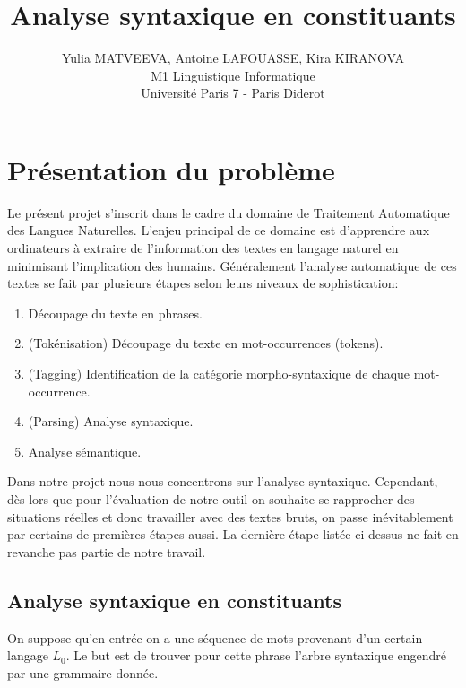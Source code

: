 \documentclass[12pt]{article}
\begin{document}
\title{Analyse syntaxique en constituants}
\author{Yulia MATVEEVA, Antoine LAFOUASSE, Kira KIRANOVA\\
M1 Linguistique Informatique\\
Universit\'e Paris 7 - Paris Diderot}
\date{}
\maketitle

\section{Pr\'esentation du probl\`eme}

Le pr\'esent projet s'inscrit dans le cadre du domaine de Traitement Automatique
des Langues Naturelles. L'enjeu principal de ce domaine est d'apprendre aux ordinateurs  
\`a extraire de l'information des textes en langage naturel en minimisant l'implication des humains. 
G\'en\'eralement l'analyse automatique de ces textes se fait par plusieurs \'etapes selon leurs niveaux de sophistication:

\begin{enumerate}
\item D\'ecoupage du texte en phrases.
\item (Tok\'enisation) D\'ecoupage du texte en mot-occurrences (tokens).
\item (Tagging) Identification de la cat\'egorie morpho-syntaxique de chaque
mot-occurrence.
\item (Parsing) Analyse syntaxique.
\item Analyse s\'emantique.
\end{enumerate}

Dans notre projet nous nous concentrons sur l'analyse syntaxique. Cependant, d\`es lors que pour l'\'evaluation de notre 
outil on souhaite se rapprocher des situations r\'eelles et donc travailler avec des textes bruts, 
on passe in\'evitablement par certains de premi\`eres \'etapes aussi. La
derni\`ere \'etape list\'ee ci-dessus ne fait en revanche pas partie de notre travail.

\subsection{Analyse syntaxique en constituants}
 On suppose qu'en entr\'ee on a une s\'equence de mots provenant d'un certain
 langage $L_0$. Le but est de trouver pour cette phrase l'arbre syntaxique
 engendr\'e par une grammaire donn\'ee.
\end{document}
